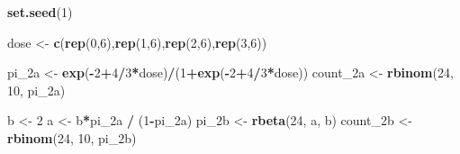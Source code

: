 \documentclass[
]{krantz}
\newenvironment{Shaded}{\begin{snugshade}}{\end{snugshade}}
\newcommand{\DecValTok}[1]{\textcolor[rgb]{0.06,0.06,0.06}{#1}}
\newcommand{\KeywordTok}[1]{\textcolor[rgb]{0.27,0.27,0.27}{\textbf{#1}}}
\newcommand{\NormalTok}[1]{#1}
\newcommand{\OperatorTok}[1]{\textcolor[rgb]{0.43,0.43,0.43}{\textbf{#1}}}
\newcommand{\StringTok}[1]{\textcolor[rgb]{0.5,0.5,0.5}{#1}}
\begin{document}
\begin{Shaded}
\begin{Highlighting}[]
\KeywordTok{set.seed}\NormalTok{(}\DecValTok{1}\NormalTok{)}

\NormalTok{dose <-}\StringTok{ }\KeywordTok{c}\NormalTok{(}\KeywordTok{rep}\NormalTok{(}\DecValTok{0}\NormalTok{,}\DecValTok{6}\NormalTok{),}\KeywordTok{rep}\NormalTok{(}\DecValTok{1}\NormalTok{,}\DecValTok{6}\NormalTok{),}\KeywordTok{rep}\NormalTok{(}\DecValTok{2}\NormalTok{,}\DecValTok{6}\NormalTok{),}\KeywordTok{rep}\NormalTok{(}\DecValTok{3}\NormalTok{,}\DecValTok{6}\NormalTok{))}

\NormalTok{pi_2a <-}\StringTok{ }\KeywordTok{exp}\NormalTok{(}\OperatorTok{-}\DecValTok{2}\OperatorTok{+}\DecValTok{4}\OperatorTok{/}\DecValTok{3}\OperatorTok{*}\NormalTok{dose)}\OperatorTok{/}\NormalTok{(}\DecValTok{1}\OperatorTok{+}\KeywordTok{exp}\NormalTok{(}\OperatorTok{-}\DecValTok{2}\OperatorTok{+}\DecValTok{4}\OperatorTok{/}\DecValTok{3}\OperatorTok{*}\NormalTok{dose))}
\NormalTok{count_2a <-}\StringTok{ }\KeywordTok{rbinom}\NormalTok{(}\DecValTok{24}\NormalTok{, }\DecValTok{10}\NormalTok{, pi_2a)}

\NormalTok{b <-}\StringTok{ }\DecValTok{2}
\NormalTok{a <-}\StringTok{ }\NormalTok{b}\OperatorTok{*}\NormalTok{pi_2a }\OperatorTok{/}\StringTok{ }\NormalTok{(}\DecValTok{1}\OperatorTok{-}\NormalTok{pi_2a)}
\NormalTok{pi_2b <-}\StringTok{ }\KeywordTok{rbeta}\NormalTok{(}\DecValTok{24}\NormalTok{, a, b)}
\NormalTok{count_2b <-}\StringTok{ }\KeywordTok{rbinom}\NormalTok{(}\DecValTok{24}\NormalTok{, }\DecValTok{10}\NormalTok{, pi_2b)  }
\end{Highlighting}
\end{Shaded}
\end{document}
